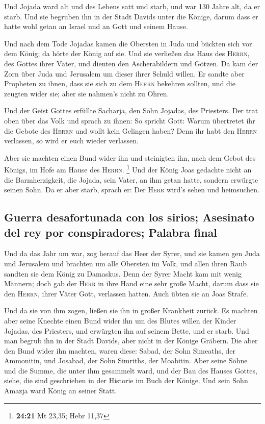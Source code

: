  Und Jojada ward alt und des Lebens satt und starb, und
war 130 Jahre alt, da er starb.  Und sie begruben ihn in
der Stadt Davids unter die Könige, darum dass er hatte wohl getan an
Israel und an Gott und seinem Hause.

 Und nach dem Tode Jojadas kamen die Obersten in Juda und
bückten sich vor dem König; da hörte der König auf sie. 
Und sie verließen das Haus des \textsc{Herrn}, des Gottes ihrer Väter,
und dienten den Ascherabildern und Götzen. Da kam der Zorn über Juda und
Jerusalem um dieser ihrer Schuld willen.  Er sandte aber
Propheten zu ihnen, dass sie sich zu dem \textsc{Herrn} bekehren
sollten, und die zeugten wider sie; aber sie nahmen's nicht zu Ohren.

 Und der Geist Gottes erfüllte Sacharja, den Sohn
Jojadas, des Priesters. Der trat oben über das Volk und sprach zu ihnen:
So spricht Gott: Warum übertretet ihr die Gebote des \textsc{Herrn} und
wollt kein Gelingen haben? Denn ihr habt den \textsc{Herrn} verlassen,
so wird er euch wieder verlassen.

 Aber sie machten einen Bund wider ihn und steinigten
ihn, nach dem Gebot des Königs, im Hofe am Hause des \textsc{Herrn}.
\footnote{\textbf{24:21} Mt 23,35; Hebr 11,37}  Und der
König Joas gedachte nicht an die Barmherzigkeit, die Jojada, sein Vater,
an ihm getan hatte, sondern erwürgte seinen Sohn. Da er aber starb,
sprach er: Der \textsc{Herr} wird's sehen und heimsuchen.

\hypertarget{guerra-desafortunada-con-los-sirios-asesinato-del-rey-por-conspiradores-palabra-final}{%
\subsection{Guerra desafortunada con los sirios; Asesinato del rey por
conspiradores; Palabra
final}\label{guerra-desafortunada-con-los-sirios-asesinato-del-rey-por-conspiradores-palabra-final}}

 Und da das Jahr um war, zog herauf das Heer der Syrer,
und sie kamen gen Juda und Jerusalem und brachten um alle Obersten im
Volk, und allen ihren Raub sandten sie dem König zu Damaskus.
 Denn der Syrer Macht kam mit wenig Männern; doch gab der
\textsc{Herr} in ihre Hand eine sehr große Macht, darum dass sie den
\textsc{Herrn}, ihrer Väter Gott, verlassen hatten. Auch übten sie an
Joas Strafe.

 Und da sie von ihm zogen, ließen sie ihn in großer
Krankheit zurück. Es machten aber seine Knechte einen Bund wider ihn um
des Blutes willen der Kinder Jojadas, des Priesters, und erwürgten ihn
auf seinem Bette, und er starb. Und man begrub ihn in der Stadt Davids,
aber nicht in der Könige Gräbern.  Die aber den Bund
wider ihn machten, waren diese: Sabad, der Sohn Simeaths, der Ammonitin,
und Josabad, der Sohn Simriths, der Moabitin.  Aber seine
Söhne und die Summe, die unter ihm gesammelt ward, und der Bau des
Hauses Gottes, siehe, die sind geschrieben in der Historie im Buch der
Könige. Und sein Sohn Amazja ward König an seiner Statt.


